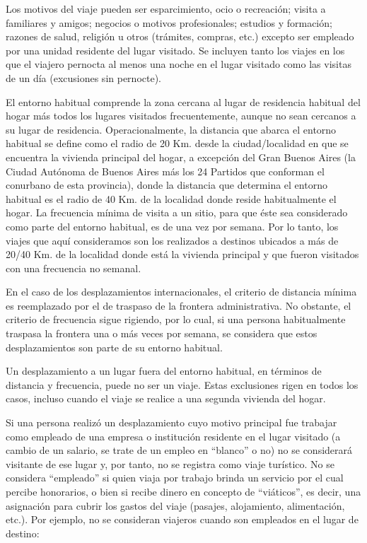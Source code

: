\documentclass[
  openany]{book}
\begin{document}
Los motivos del viaje pueden ser esparcimiento, ocio o recreación; visita a familiares y amigos; negocios o motivos profesionales; estudios y formación; razones de salud, religión u otros (trámites, compras, etc.) excepto ser empleado por una unidad residente del lugar visitado. Se incluyen tanto los viajes en los que el viajero pernocta al menos una noche en el lugar visitado como las visitas de un día (excusiones sin pernocte).

El entorno habitual comprende la zona cercana al lugar de residencia habitual del hogar más todos los lugares visitados frecuentemente, aunque no sean cercanos a su lugar de residencia. Operacionalmente, la distancia que abarca el entorno habitual se define como el radio de 20 Km. desde la ciudad/localidad en que se encuentra la vivienda principal del hogar, a excepción del Gran Buenos Aires (la Ciudad Autónoma de Buenos Aires más los 24 Partidos que conforman el conurbano de esta provincia), donde la distancia que determina el entorno habitual es el radio de 40 Km. de la localidad donde reside habitualmente el hogar. La frecuencia mínima de visita a un sitio, para que éste sea considerado como parte del entorno habitual, es de una vez por semana. Por lo tanto, los viajes que aquí consideramos son los realizados a destinos ubicados a más de 20/40 Km. de la localidad donde está la vivienda principal y que fueron visitados con una frecuencia no semanal.

En el caso de los desplazamientos internacionales, el criterio de distancia mínima es reemplazado por el de traspaso de la frontera administrativa. No obstante, el criterio de frecuencia sigue rigiendo, por lo cual, si una persona habitualmente traspasa la frontera una o más veces por semana, se considera que estos desplazamientos son parte de su entorno habitual.

Un desplazamiento a un lugar fuera del entorno habitual, en términos de distancia y frecuencia, puede no ser un viaje. Estas exclusiones rigen en todos los casos, incluso cuando el viaje se realice a una segunda vivienda del hogar.

Si una persona realizó un desplazamiento cuyo motivo principal fue trabajar como empleado de una empresa o institución residente en el lugar visitado (a cambio de un salario, se trate de un empleo en ``blanco'' o no) no se considerará visitante de ese lugar y, por tanto, no se registra como viaje turístico. No se considera ``empleado'' si quien viaja por trabajo brinda un servicio por el cual percibe honorarios, o bien si recibe dinero en concepto de ``viáticos'', es decir, una asignación para cubrir los gastos del viaje (pasajes, alojamiento, alimentación, etc.). Por ejemplo, no se consideran viajeros cuando son empleados en el lugar de destino:
\end{document}

